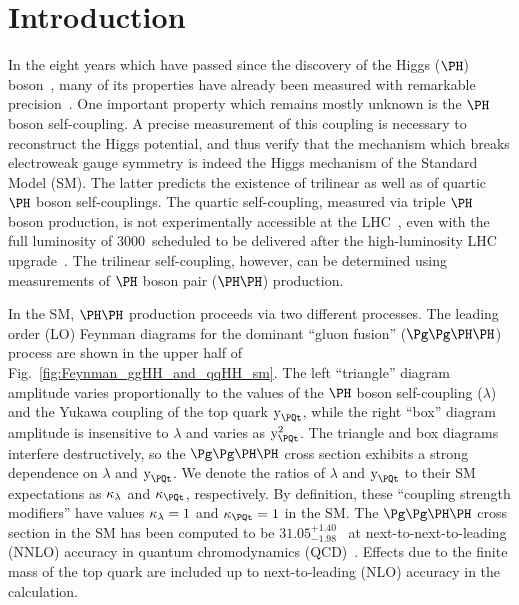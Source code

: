 \section{Introduction}
\label{sec:introduction}

In the eight years which have passed since the discovery of the Higgs ($\PHiggs$) boson~\cite{Higgs-Discovery_CMS,Higgs-Discovery_CMS_long,Higgs-Discovery_ATLAS},
many of its properties have already been measured with remarkable precision~\cite{HIG-14-042,HIG-15-002,ATLAS_SpinCP,HIG-14-018,HIG-16-041}. %
One important property which remains mostly unknown is the $\PHiggs$ boson self-coupling.
A precise measurement of this coupling is necessary to reconstruct the Higgs potential,
and thus verify that the mechanism which breaks electroweak gauge symmetry is indeed the Higgs mechanism of the Standard Model (SM).
The latter predicts the existence of trilinear as well as of quartic $\PHiggs$ boson self-couplings.
The quartic self-coupling, measured via triple $\PHiggs$ boson production, is not experimentally accessible at the LHC~\cite{de_Florian_2020},
even with the full luminosity of 3000~\fbinv scheduled to be delivered after the high-luminosity LHC upgrade~\cite{HL-LHC-TDR}.
The trilinear self-coupling, however, can be determined using measurements of $\PHiggs$ boson pair ($\HH$) production. %

In the SM, $\HH$ production proceeds via two different processes.
The leading order (LO) Feynman diagrams for the dominant ``gluon fusion'' ($\ggHH$) process are shown in the upper half of Fig.~\ref{fig:Feynman_ggHH_and_qqHH_sm}.
The left ``triangle'' diagram amplitude varies proportionally to the values of the $\PHiggs$ boson self-coupling ($\lambda$)
and the Yukawa coupling of the top quark $\yt$,
while the right ``box'' diagram amplitude is insensitive to $\lambda$ and varies as $\yt^{2}$.
The triangle and box diagrams interfere destructively, 
so the $\ggHH$ cross section exhibits a strong dependence on $\lambda$ and $\yt$.
We denote the ratios of $\lambda$ and $\yt$ to their SM expectations as $\kappa_{\lambda}$ and $\kappat$, respectively.
By definition, these ``coupling strength modifiers'' have values $\kappa_{\lambda} = 1$ and $\kappat = 1$ in the SM.
The $\ggHH$ cross section in the SM has been computed to be $31.05^{+1.40}_{-1.98}$~\fb
at next-to-next-to-leading (NNLO) accuracy in quantum chromodynamics (QCD)~\cite{Grazzini:2018hh}.
Effects due to the finite mass of the top quark are included up to next-to-leading (NLO) accuracy in the calculation.

